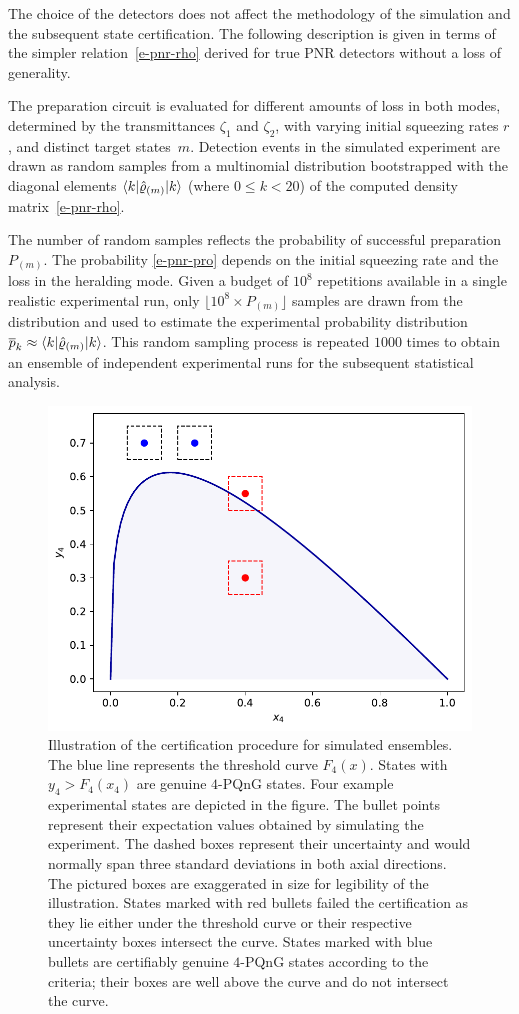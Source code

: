 \documentclass{article}
\begin{document}
The choice of the detectors does not affect the methodology of the simulation and the subsequent state certification. The following description is given in terms of the simpler relation~\eqref{e-pnr-rho} derived for true PNR detectors without a loss of generality.

The preparation circuit is evaluated for different amounts of loss in both modes, determined by the transmittances $\zeta_{1}$ and $\zeta_{2}$, with varying initial squeezing rates $r$, and distinct target states~${m}$. Detection events in the simulated experiment are drawn as random samples from a multinomial distribution bootstrapped with the diagonal elements $\braket{k|\hat{\varrho}_{(m)}|k}$ (where $0 \leq k < 20$) of the computed density matrix~\eqref{e-pnr-rho}. 

The number of random samples reflects the probability of successful preparation $P_{(m)}$. The probability \eqref{e-pnr-pro} depends on the initial squeezing rate and the loss in the heralding mode. Given a budget of $10^{8}$ repetitions available in a single realistic experimental run, only ${\lfloor 10^{8} \times P_{(m)} \rfloor}$ samples are drawn from the distribution and used to estimate the experimental probability distribution ${\overline{p}_{k} \approx \braket{k|\hat{\varrho}_{(m)}|k}}$. This random sampling process is repeated $1000$ times to obtain an ensemble of independent experimental runs for the subsequent statistical analysis.

\begin{figure}[h]
  \begin{center}
    \includegraphics[width = 0.50 \columnwidth]{import/illustrate_lachman_curve.pdf}
  \end{center}
  \caption{
    Illustration of the certification procedure for simulated ensembles. The blue line represents the threshold curve $F_{4} (x)$. States with $y_{4} > F_{4}(x_{4})$ are genuine $4$-PQnG states. Four example experimental states are depicted in the figure. The bullet points represent their expectation values obtained by simulating the experiment. The dashed boxes represent their uncertainty and would normally span three standard deviations in both axial directions. The pictured boxes are exaggerated in size for legibility of the illustration. States marked with red bullets failed the certification as they lie either under the threshold curve or their respective uncertainty boxes intersect the curve. States marked with blue bullets are certifiably genuine $4$-PQnG states according to the criteria; their boxes are well above the curve and do not intersect the curve.
  }
  \label{f-otm-il}
\end{figure}
\end{document}
